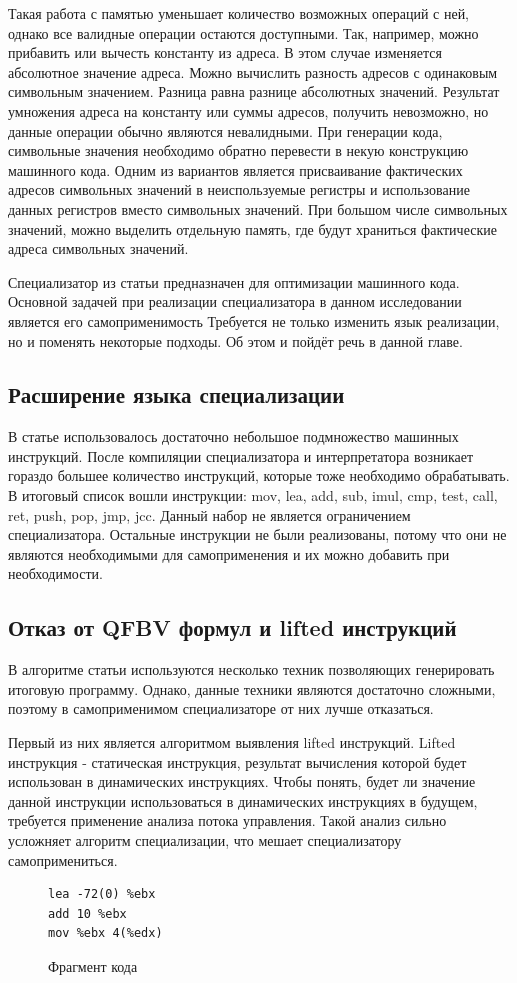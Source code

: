 Такая работа с памятью уменьшает количество возможных операций с ней, однако все валидные операции остаются доступными. Так, например, можно прибавить или вычесть константу из адреса. В этом случае изменяется абсолютное значение адреса. Можно вычислить разность адресов с одинаковым символьным значением. Разница равна разнице абсолютных значений. Результат умножения адреса на константу или суммы адресов, получить невозможно, но данные операции обычно являются невалидными. При генерации кода, символьные значения необходимо обратно перевести в некую конструкцию машинного кода. Одним из вариантов является присваивание фактических адресов символьных значений в неиспользуемые регистры и использование данных регистров вместо символьных значений. При большом числе символьных значений, можно выделить отдельную память, где будут храниться фактические адреса символьных значений.

Специализатор из статьи \cite{PEMC} предназначен для оптимизации машинного кода. Основной задачей при реализации специализатора в данном исследовании является его самоприменимость Требуется не только изменить язык реализации, но и поменять некоторые подходы. Об этом и пойдёт речь в данной главе.
\subsection{ Расширение языка специализации}
\label{part:4.4}
В статье \cite{PEMC} использовалось достаточно небольшое подмножество машинных инструкций. После компиляции специализатора и интерпретатора возникает гораздо большее количество инструкций, которые тоже необходимо обрабатывать. В итоговый список вошли инструкции: mov, lea, add, sub, imul, cmp, test, call, ret, push, pop, jmp, jcc. Данный набор не является ограничением специализатора. Остальные инструкции не были реализованы, потому что они не являются необходимыми для самоприменения и их можно добавить при необходимости.
\subsection{ Отказ от QFBV формул и lifted инструкций}
\label{part:4.5}

В алгоритме статьи \cite{PEMC} используются несколько техник позволяющих генерировать итоговую программу. Однако, данные техники являются достаточно сложными, поэтому в самоприменимом специализаторе от них лучше отказаться. 

Первый из них является алгоритмом выявления lifted инструкций. Lifted инструкция - статическая инструкция, результат вычисления которой будет использован в динамических инструкциях. Чтобы понять, будет ли значение данной инструкции использоваться в динамических инструкциях в будущем, требуется применение анализа потока управления. Такой анализ сильно усложняет алгоритм специализации, что мешает специализатору самопримениться. 
\begin{figure}
\begin{lstlisting}[xleftmargin = 20pt]
lea -72(0) %ebx
add 10 %ebx
mov %ebx 4(%edx)
\end{lstlisting}
\caption{Фрагмент кода}
\label{fig:qfbv1}
\end{figure}

